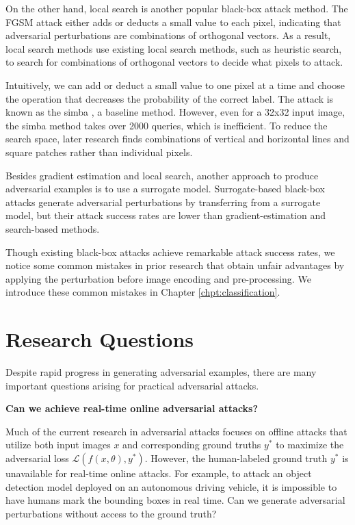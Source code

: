 On the other hand, local search is another popular black-box attack method. The FGSM attack either adds or deducts a small value to each pixel, indicating that adversarial perturbations are combinations of orthogonal vectors. As a result, local search methods use existing local search methods, such as heuristic search, to search for combinations of orthogonal vectors to decide what pixels to attack.

Intuitively, we can add or deduct a small value to one pixel at a time and choose the operation that decreases the probability of the correct label. The attack is known as the \acrfull{simba} \cite{guo2019simple}, a baseline method. However, even for a 32x32 input image, the \acrshort{simba} method takes over 2000 queries, which is inefficient. To reduce the search space, later research finds combinations of vertical and horizontal lines and square patches rather than individual pixels.

\clearpage

Besides gradient estimation and local search, another approach to produce adversarial examples is to use a surrogate model. Surrogate-based black-box attacks generate adversarial perturbations by transferring from a surrogate model, but their attack success rates are lower than gradient-estimation and search-based methods.

Though existing black-box attacks achieve remarkable attack success rates, we notice some common mistakes in prior research that obtain unfair advantages by applying the perturbation before image encoding and pre-processing. We introduce these common mistakes in Chapter \ref{chpt:classification}.

\section{Research Questions}
\label{sec:research_question}

Despite rapid progress in generating adversarial examples, there are many important questions arising for practical adversarial attacks.

\vspace{0.5cm}

\textbf{Can we achieve real-time online adversarial attacks?}

Much of the current research in adversarial attacks focuses on offline attacks that utilize both input images $x$ and corresponding ground truths $y^*$ to maximize the adversarial loss $\mathcal{L}(f(x, \theta), y^*)$. However, the human-labeled ground truth $y^*$ is unavailable for real-time online attacks. For example, to attack an object detection model deployed on an autonomous driving vehicle, it is impossible to have humans mark the bounding boxes in real time. Can we generate adversarial perturbations without access to the ground truth?


